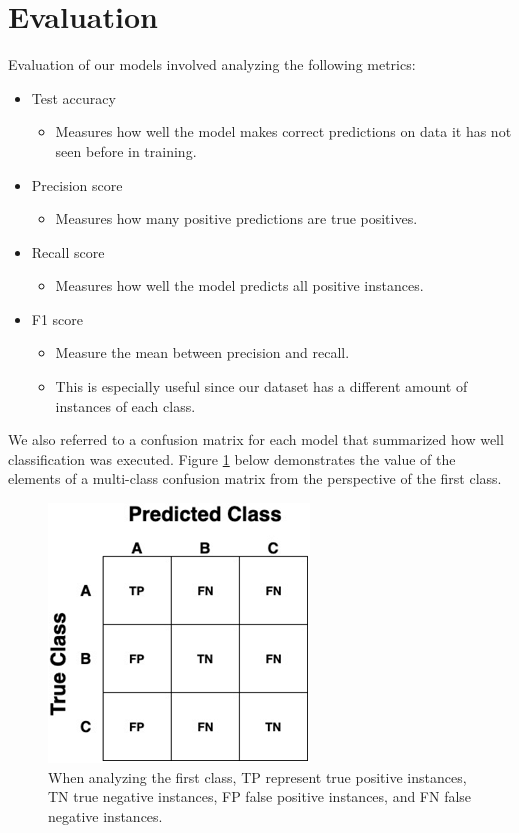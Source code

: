 \graphicspath{ {project_images/} }

\section{Evaluation}
Evaluation of our models involved analyzing the following metrics:

\begin{itemize}
	\item Test accuracy
	\begin{itemize}
		\item Measures how well the model makes correct predictions on data it has not seen before in training.
	\end{itemize}
	\item Precision score
	\begin{itemize}
		\item Measures how many positive predictions are true positives.
	\end{itemize}
	\item Recall score
	\begin{itemize}
		\item Measures how well the model predicts all positive instances.
	\end{itemize}
	\item F1 score
	\begin{itemize}
		\item Measure the mean between precision and recall.
		\item This is especially useful since our dataset has a different amount of instances of each class. 
	\end{itemize}
\end{itemize}

We also referred to a confusion matrix for each model that summarized how well classification was executed. Figure \ref{fig:figure3} below demonstrates the value of the elements of a multi-class confusion matrix from the perspective of the first class.

\begin{figure}[h]
	\centering
	\includegraphics[scale=0.5]{multiclass_cfm}
	\caption{When analyzing the first class, TP represent true positive instances, TN true negative instances, FP false positive instances, and FN false negative instances.}
	\label{fig:figure3}
\end{figure}


